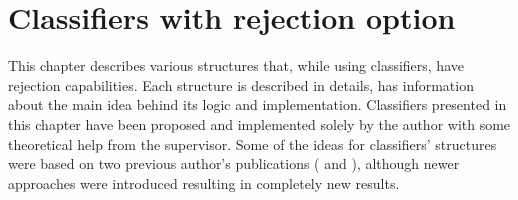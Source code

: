 \chapter{Classifiers with rejection option}
\label{classifiers_with_rejection_option}

This chapter describes various structures that, while using classifiers, have rejection capabilities. Each structure is described in details, has information about the main idea behind its logic and implementation. Classifiers presented in this chapter have been proposed and implemented solely by the author with some theoretical help from the supervisor. Some of the ideas for classifiers' structures were based on two previous author's publications (\cite{PiotrWaszkiewicz1} and \cite{PiotrWaszkiewicz2}), although newer approaches were introduced resulting in completely new results.